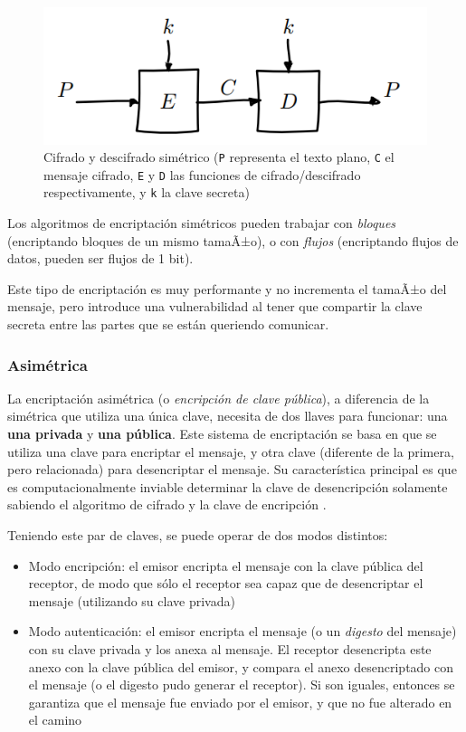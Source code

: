 \begin{figure}[H]
    \centering
    \includegraphics[width=0.8\linewidth]{images/van-houvten-simetrico.png}
    \caption*{Cifrado y descifrado simétrico (\texttt{P} representa el texto plano, \texttt{C} el mensaje cifrado, \texttt{E} y \texttt{D} las funciones de cifrado/descifrado respectivamente, y \texttt{k} la clave secreta) \autocite{VanhouvtenBlockCiphers}}
\end{figure}

Los algoritmos de encriptación simétricos pueden trabajar con \emph{bloques} (encriptando bloques de un mismo tamaÃ±o), o con \emph{flujos} (encriptando flujos de datos, pueden ser flujos de 1 bit).  

Este tipo de encriptación es muy performante y no incrementa el tamaÃ±o del mensaje, pero introduce una vulnerabilidad al tener que compartir la clave secreta entre las partes que se están queriendo comunicar.

\subsubsection{Asimétrica}

La encriptación asimétrica (o \emph{encripción de clave pública}), a diferencia de la simétrica que utiliza una única clave, necesita de dos llaves para funcionar: una \textbf{una privada} y \textbf{una pública}.  
Este sistema de encriptación se basa en que se utiliza una clave para encriptar el mensaje, y otra clave (diferente de la primera, pero relacionada) para desencriptar el mensaje. Su característica principal es que es computacionalmente inviable determinar la clave de desencripción solamente sabiendo el algoritmo de cifrado y la clave de encripción \autocite{StallingsPublicKeyPrinciples}.

Teniendo este par de claves, se puede operar de dos modos distintos:

\begin{itemize}
    \item Modo encripción: el emisor encripta el mensaje con la clave pública del receptor, de modo que sólo el receptor sea capaz que de desencriptar el mensaje (utilizando su clave privada)
    \item Modo autenticación: el emisor encripta el mensaje (o un \emph{digesto} del mensaje) con su clave privada y los anexa al mensaje. El receptor desencripta este anexo con la clave pública del emisor, y compara el anexo desencriptado con el mensaje (o el digesto pudo generar el receptor). Si son iguales, entonces se garantiza que el mensaje fue enviado por el emisor, y que no fue alterado en el camino
\end{itemize}

